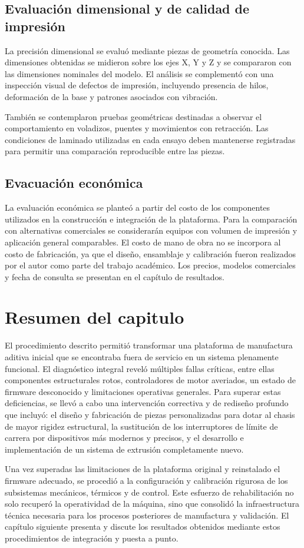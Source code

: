\subsection{Evaluación dimensional y de calidad de impresión}
La precisión dimensional se evaluó mediante piezas de geometría conocida. Las dimensiones obtenidas se midieron sobre los ejes X, Y y Z y se compararon con las dimensiones nominales del modelo. El análisis se complementó con una inspección visual de defectos de impresión, incluyendo presencia de hilos, deformación de la base y patrones asociados con vibración.

También se contemplaron pruebas geométricas destinadas a observar el comportamiento en voladizos, puentes y movimientos con retracción. Las condiciones de laminado utilizadas en cada ensayo deben mantenerse registradas para permitir una comparación reproducible entre las piezas.

\subsection{Evacuación económica}
La evaluación económica se planteó a partir del costo de los componentes utilizados en la construcción e integración de la plataforma. Para la comparación con alternativas comerciales se considerarán equipos con volumen de impresión y aplicación general comparables. El costo de mano de obra no se incorpora al costo de fabricación, ya que el diseño, ensamblaje y calibración fueron realizados por el autor como parte del trabajo académico. Los precios, modelos comerciales y fecha de consulta se presentan en el capítulo de resultados.

\section{Resumen del capitulo}
El procedimiento descrito permitió transformar una plataforma de manufactura aditiva inicial que se encontraba fuera de servicio en un sistema plenamente funcional. El diagnóstico integral reveló múltiples fallas críticas, entre ellas componentes estructurales rotos, controladores de motor averiados, un estado de firmware desconocido y limitaciones operativas generales. Para superar estas deficiencias, se llevó a cabo una intervención correctiva y de rediseño profundo que incluyó: el diseño y fabricación de piezas personalizadas para dotar al chasis de mayor rigidez estructural, la sustitución de los interruptores de límite de carrera por dispositivos más modernos y precisos, y el desarrollo e implementación de un sistema de extrusión completamente nuevo. 

Una vez superadas las limitaciones de la plataforma original y reinstalado el firmware adecuado, se procedió a la configuración y calibración rigurosa de los subsistemas mecánicos, térmicos y de control. Este esfuerzo de rehabilitación no solo recuperó la operatividad de la máquina, sino que consolidó la infraestructura técnica necesaria para los procesos posteriores de manufactura y validación. El capítulo siguiente presenta y discute los resultados obtenidos mediante estos procedimientos de integración y puesta a punto.